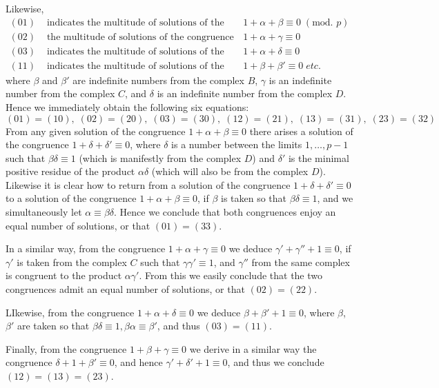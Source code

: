 \documentclass{book}
\theoremstyle{plain}
\theoremstyle{remark}
\begin{document}
Likewise, 
\[ 
\begin{array}{lll} 
(01) & \textrm{ indicates the multitude of solutions of the congruence} & 1 + \alpha + \beta \equiv 0 \;(\textrm{mod. }p) \\
(02) & \textrm{ the multitude of solutions of the congruence} & 1 + \alpha + \gamma \equiv 0 \; \\
(03) & \textrm{ indicates the multitude of solutions of the congruence} & 1 + \alpha + \delta \equiv 0 \; \\
(11) & \textrm{ indicates the multitude of solutions of the congruence} & 1 + \beta + \beta' \equiv 0 \;etc.
\end{array}
\]
where $\beta$ and $\beta'$ are indefinite numbers from the complex $B$, $\gamma$ is an indefinite number from the complex $C$, and $\delta$ is an indefinite number from the complex $D$.  Hence we immediately obtain the following six equations:
\[ (01)=(10), \; (02)=(20), \; (03)=(30), \; (12)=(21), \; (13)=(31), \; (23)=(32) \]
From any given solution of the congruence $1 + \alpha + \beta \equiv 0$ there arises a solution of the congruence $1 + \delta + \delta' \equiv 0$, where $\delta$ is a number between the limits $1,\dots, p-1$ such that $\beta\delta \equiv 1$ (which is manifestly from the complex $D$) and $\delta'$ is the minimal positive residue of the product $\alpha \delta$ (which will also be from the complex $D$).  Likewise it is clear how to return from a solution of the congruence $1 + \delta + \delta' \equiv 0$ to a solution of the congruence $1 + \alpha + \beta \equiv 0$, if $\beta$ is taken so that $\beta \delta \equiv 1$, and we simultaneously let $\alpha \equiv \beta \delta$.  Hence we conclude that both congruences enjoy an equal number of solutions, or that $(01)=(33)$.  

In a similar way, from the congruence $1 + \alpha + \gamma \equiv 0$ we deduce $\gamma' + \gamma''+1\equiv 0$, if $\gamma'$ is taken from the complex $C$ such that $\gamma \gamma' \equiv 1$, and $\gamma''$ from the same complex is congruent to the product $\alpha \gamma'$.  From this we easily conclude that the two congruences admit an equal number of solutions, or that $(02)=(22)$. 

LIkewise, from the congruence $1 + \alpha + \delta \equiv 0$ we deduce $\beta + \beta' + 1 \equiv 0$, where $\beta$, $\beta'$ are taken so that $\beta \delta \equiv 1, \beta \alpha \equiv \beta'$, and thus $(03) = (11)$.  

Finally, from the congruence $1 + \beta + \gamma \equiv 0$ we derive in a similar way the congruence $\delta + 1 + \beta' \equiv 0$, and hence $\gamma' + \delta' + 1 \equiv 0$, and thus we conclude $(12)=(13)=(23)$. 
\end{document}
